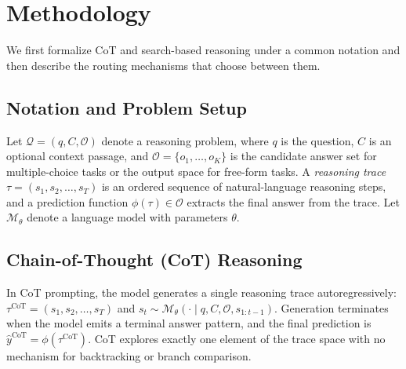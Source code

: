 \documentclass[11pt]{article}
\begin{document}

\section{Methodology}
\label{sec:method}

We first formalize CoT and search-based reasoning under a common notation and then describe the routing mechanisms that choose between them.

\subsection{Notation and Problem Setup}
\label{sec:notation}

Let $\mathcal{Q} = (q, C, \mathcal{O})$ denote a reasoning problem, where $q$ is the question, $C$ is an optional context passage, and $\mathcal{O} = \{o_1, \ldots, o_K\}$ is the candidate answer set for multiple-choice tasks or the output space for free-form tasks. A \emph{reasoning trace} $\tau = (s_1, s_2, \ldots, s_T)$ is an ordered sequence of natural-language reasoning steps, and a prediction function $\phi(\tau) \in \mathcal{O}$ extracts the final answer from the trace. Let $\mathcal{M}_\theta$ denote a language model with parameters $\theta$.

\subsection{Chain-of-Thought (CoT) Reasoning}
\label{sec:cot}

In CoT prompting, the model generates a single reasoning trace autoregressively: $\tau^{\text{CoT}} = (s_1, s_2, \ldots, s_T)$ and $s_t \sim \mathcal{M}_\theta(\cdot \mid q, C, \mathcal{O}, s_{1:t-1})$.
Generation terminates when the model emits a terminal answer pattern, and the final prediction is $\hat{y}^{\text{CoT}} = \phi(\tau^{\text{CoT}})$. CoT explores exactly one element of the trace space with no mechanism for backtracking or branch comparison.
\end{document}
